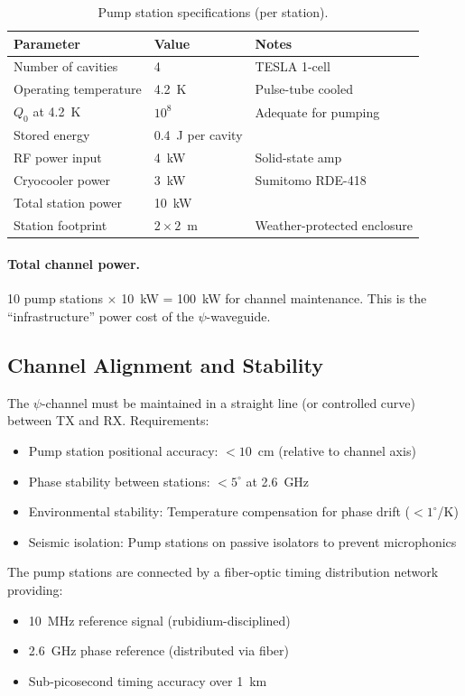 \documentclass[11pt,letterpaper]{article}
\begin{document}
\begin{table}[H]
\caption{Pump station specifications (per station).}
\begin{tabular}{lll}
\toprule
Parameter & Value & Notes \\
\midrule
Number of cavities & 4 & TESLA 1-cell \\
Operating temperature & 4.2~K & Pulse-tube cooled \\
$Q_0$ at 4.2~K & $10^8$ & Adequate for pumping \\
Stored energy & 0.4~J per cavity & \\
RF power input & 4~kW & Solid-state amp \\
Cryocooler power & 3~kW & Sumitomo RDE-418 \\
Total station power & 10~kW & \\
Station footprint & $2 \times 2$~m & Weather-protected enclosure \\
\bottomrule
\end{tabular}
\end{table}

\paragraph{Total channel power.} 10 pump stations $\times$ 10~kW = 100~kW
for channel maintenance. This is the ``infrastructure'' power cost of
the $\psi$-waveguide.

\subsection{Channel Alignment and Stability}

The $\psi$-channel must be maintained in a straight line (or
controlled curve) between TX and RX. Requirements:
\begin{itemize}
\item Pump station positional accuracy: $< 10$~cm (relative to channel axis)
\item Phase stability between stations: $< 5^\circ$ at 2.6~GHz
\item Environmental stability: Temperature compensation for
phase drift ($< 1^\circ$/K)
\item Seismic isolation: Pump stations on passive isolators to
prevent microphonics
\end{itemize}

The pump stations are connected by a fiber-optic timing distribution
network providing:
\begin{itemize}
\item 10~MHz reference signal (rubidium-disciplined)
\item 2.6~GHz phase reference (distributed via fiber)
\item Sub-picosecond timing accuracy over 1~km
\end{itemize}
\end{document}
